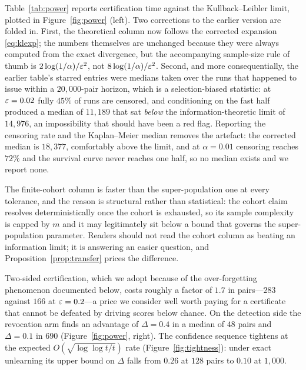 Table~\ref{tab:power} reports certification time against the Kullback--Leibler limit,
plotted in Figure~\ref{fig:power} (left). Two corrections to the earlier version are
folded in. First, the theoretical column now
follows the corrected expansion \eqref{eq:klexp}; the numbers themselves are unchanged
because they were always computed from the exact divergence, but the accompanying
sample-size rule of thumb is $2\log(1/\alpha)/\varepsilon^2$, not $8\log(1/\alpha)/\varepsilon^2$.
Second, and more consequentially, the earlier table's starred entries were medians
taken over the runs that happened to issue within a $20{,}000$-pair horizon, which is
a selection-biased statistic: at $\eps = 0.02$ fully $45\%$ of runs are censored, and
conditioning on the fast half produced a median of $11{,}189$ that sat \emph{below} the
information-theoretic limit of $14{,}976$, an impossibility that should have been a
red flag. Reporting the censoring rate and the Kaplan--Meier median removes the
artefact: the corrected median is $18{,}377$, comfortably above the limit, and at
$\alpha = 0.01$ censoring reaches $72\%$ and the survival curve never reaches one half,
so no median exists and we report none.

The finite-cohort column is faster than the super-population one at every tolerance,
and the reason is structural rather than statistical: the cohort claim resolves
deterministically once the cohort is exhausted, so its sample complexity is capped by
$m$ and it may legitimately sit below a bound that governs the super-population
parameter. Readers should not read the cohort column as beating an information limit;
it is answering an easier question, and Proposition~\ref{prop:transfer} prices the
difference.

Two-sided certification, which we adopt because of the over-forgetting phenomenon
documented below, costs roughly a factor of $1.7$ in pairs---$283$ against $166$ at
$\varepsilon=0.2$---a price we consider well worth paying for a certificate that cannot be
defeated by driving scores below chance. On the detection side the revocation arm finds
an advantage of $\Delta=0.4$ in a median of $48$ pairs and $\Delta=0.1$ in $690$
(Figure~\ref{fig:power}, right). The
confidence sequence tightens at the expected $O(\sqrt{\log\log t / t})$ rate
(Figure~\ref{fig:tightness}): under exact unlearning its upper bound on $\Delta$ falls
from $0.26$ at $128$ pairs to $0.10$ at $1{,}000$.

\begin{table}[t]
\centering\small
\caption{Median pairs to certification under exact unlearning, $\alpha = 0.05$,
horizon $20{,}000$ pairs, $500$ seeds per cell. For the super-population target the
median over issued runs is selection-biased where censoring is heavy, so the
Kaplan--Meier median and the censoring rate are given. The $\mathrm{KL}$ column is the
information limit for the \emph{super-population} target only: the cohort claim
resolves once the cohort is exhausted, so its time is capped by $m$ and may legitimately
fall below that limit. At $\alpha = 0.01$ (not shown) censoring at $\eps = 0.02$ reaches
$72\%$ and the survival curve never reaches one half, so no median exists.}
\label{tab:power}

\end{table}

